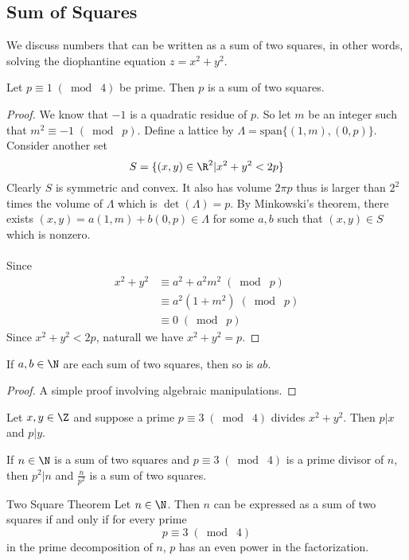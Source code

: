 \subsection{Sum of Squares}
We discuss numbers that can be written as a sum of two squares, in other words, solving the diophantine equation $z=x^2+y^2$. 
\begin{thm}{}{} Let $p\equiv 1\;(\bmod\;4)$ be prime. Then $p$ is a sum of two squares. \tcbline
\begin{proof}
We know that $-1$ is a quadratic residue of $p$. So let $m$ be an integer such that $m^2\equiv -1\;(\bmod\;p)$. Define a lattice by $\Lambda=\text{span}\{(1,m),(0,p)\}$. Consider another set $$S=\{(x,y)\in\R^2|x^2+y^2<2p\}$$ Clearly $S$ is symmetric and convex. It also has volume $2\pi p$ thus is larger than $2^2$ times the volume of $\Lambda$ which is $\det(\Lambda)=p$. By Minkowski's theorem, there exists $(x,y)=a(1,m)+b(0,p)\in\Lambda$ for some $a,b$ such that $(x,y)\in S$ which is nonzero. \\~\\
Since 
\begin{align*}
x^2+y^2&\equiv a^2+a^2m^2\;(\bmod\;p)\\
&\equiv a^2(1+m^2)\;(\bmod\;p)\\
&\equiv 0\;(\bmod\;p)
\end{align*}
Since $x^2+y^2<2p$, naturall we have $x^2+y^2=p$. 
\end{proof}
\end{thm}

\begin{lmm}{}{} If $a,b\in\N$ are each sum of two squares, then so is $ab$. \tcbline
\begin{proof}
A simple proof involving algebraic manipulations. 
\end{proof}
\end{lmm}

\begin{lmm}{}{} Let $x,y\in\Z$ and suppose a prime $p\equiv 3\;(\bmod\;4)$ divides $x^2+y^2$. Then $p|x$ and $p|y$. 
\end{lmm}

\begin{crl}{}{} If $n\in\N$ is a sum of two squares and $p\equiv 3\;(\bmod\;4)$ is a prime divisor of $n$, then $p^2|n$ and $\frac{n}{p^2}$ is a sum of two squares. 
\end{crl}

\begin{thm}{Two Square Theorem}{} Let $n\in\N$. Then $n$ can be expressed as a sum of two squares if and only if for every prime $$p\equiv 3\;(\bmod\;4)$$ in the prime decomposition of $n$, $p$ has an even power in the factorization. 
\end{thm}

